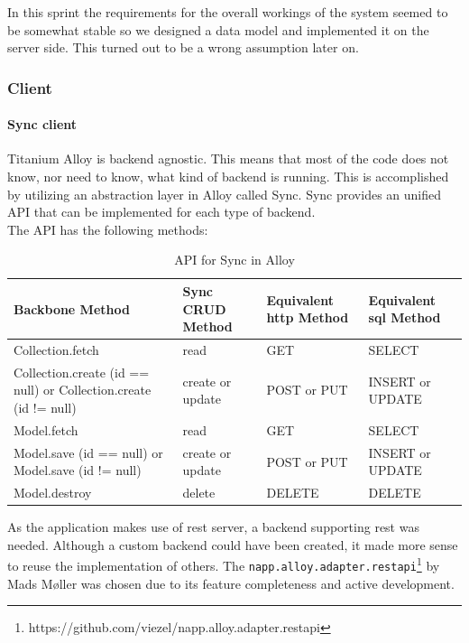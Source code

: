 \documentclass[11pt]{book}
\begin{document}
In this sprint the requirements for the overall workings of the system seemed to be somewhat stable so we designed a data model and implemented it on the server side. This turned out to be a wrong assumption later on.

\subsubsection{Client}
\paragraph{Sync client}
Titanium Alloy is backend agnostic. This means that most of the code does not know, nor need to know, what kind of backend is running. This is accomplished by utilizing an abstraction layer in Alloy called Sync. Sync provides an unified API that can be implemented for each type of backend.\\
The API has the following methods:

\begin{table}[H]
    \centering
    \begin{tabular}{| p{3.5cm} | p{3.5cm} | p{3.5cm} | p{2.5cm} |}
        \hline
        Backbone Method & Sync CRUD Method & Equivalent \gls{http} Method & Equivalent \gls{sql} Method\\
        \hline
        Collection.fetch & read & GET & SELECT\\
        \hline
        Collection.create (id == null) or Collection.create (id != null) & create or update & POST or PUT & INSERT or UPDATE\\
        \hline
        Model.fetch & read    & GET & SELECT\\
        \hline
        Model.save (id == null) or Model.save (id != null) & create or update & POST or PUT & INSERT or UPDATE\\
        \hline
        Model.destroy & delete & DELETE & DELETE\\
        \hline
    \end{tabular}
    \caption{API for Sync in Alloy\cite{titaniumAlloySync}}
    \label{tab:phase_sprint2_model}
\end{table}

As the application makes use of \gls{rest} server, a backend supporting \gls{rest} was needed. Although a custom backend could have been created, it made more sense to reuse the implementation of others. The \texttt{napp.alloy.adapter.restapi}\footnote{https://github.com/viezel/napp.alloy.adapter.restapi} by Mads Møller was chosen due to its feature completeness and active development.
\end{document}
